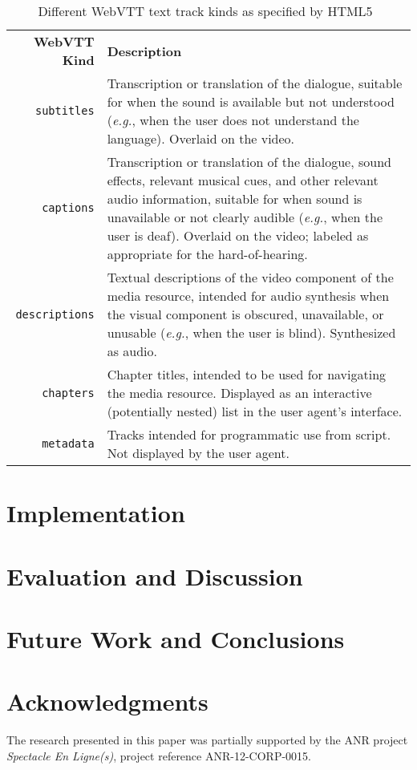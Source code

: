 \documentclass{sig-alternate}
\begin{document}
\begin{table*}[h!]\footnotesize
\begin{tabular}{ r p{15cm} }
\textbf{WebVTT Kind} & \textbf{Description}\\

\texttt{subtitles} & Transcription or translation of the dialogue,
suitable for when the sound is available but not understood
(\emph{e.g.}, when the user does not understand the language). Overlaid on the video.\\

\texttt{captions} & Transcription or translation of the dialogue,
sound effects, relevant musical cues,
and other relevant audio information,
suitable for when sound is unavailable or not clearly audible
(\emph{e.g.}, when the user is deaf). Overlaid on the video;
labeled as appropriate for the hard-of-hearing.\\

\texttt{descriptions} & Textual descriptions of the video component
of the media resource, intended for audio synthesis
when the visual component is obscured, unavailable, or unusable
(\emph{e.g.}, when the user is blind).
Synthesized as audio.\\

\texttt{chapters} & Chapter titles, intended to be used for navigating
the media resource. Displayed as an interactive (potentially nested)
list in the user agent's interface.\\

\texttt{metadata} & Tracks intended for programmatic use from script.
Not displayed by the user agent.\\
\end{tabular}
  \caption{Different WebVTT text track kinds as specified by
    HTML5~\cite{berjon2013html5}}
  \label{table:texttrackkinds}
\end{table*}

\section{Implementation}

\section{Evaluation and Discussion}

\section{Future Work and Conclusions}

\section*{Acknowledgments}

The research presented in this paper
was partially supported by the ANR project
\emph{Spectacle En Ligne(s)}, project reference
\mbox{ANR-12-CORP-0015}.



\end{document}
